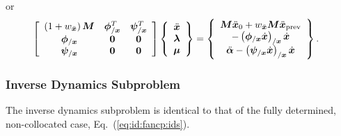 or
\begin{align}
	\sqbr{\matr{ccc}{
		\plbr{1 + w_{\ddot{\T{x}}}} \TT{M} & \T{\phi}_{/\T{x}}^T & \T{\psi}_{/\T{x}}^T
		\\
		\T{\phi}_{/\T{x}} & \TT{0} & \TT{0}
		\\
		\T{\psi}_{/\T{x}} & \TT{0} & \TT{0}
	}} \cubr{\cvvect{
		\ddot{\T{x}}
		\\
		\T{\lambda}
		\\
		\T{\mu}
	}}
	&=
	\cubr{\cvvect{
		\TT{M} \ddot{\T{x}}_0 + w_{\ddot{\T{x}}} \TT{M} \ddot{\T{x}}_\text{prev}
		\\
		-\plbr{\T{\phi}_{/\T{x}} \dot{\T{x}}}_{/\T{x}} \dot{\T{x}}
		\\
		\ddot{\T{\alpha}}
		-
		\plbr{\T{\psi}_{/\T{x}} \dot{\T{x}}}_{/\T{x}} \dot{\T{x}}
	}}
	.
\end{align}

\subsubsection{Inverse Dynamics Subproblem}
The inverse dynamics subproblem is identical to that
of the fully determined, non-collocated case, Eq.~(\ref{eq:id:fancp:ids}).



